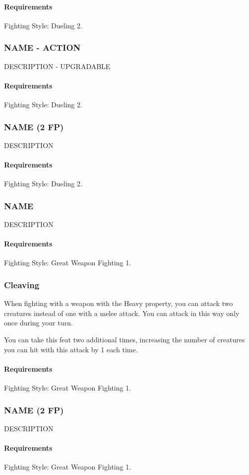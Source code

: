     \paragraph{Requirements} Fighting Style: Dueling 2.
\subsubsection{NAME - ACTION} \label{feat::name}
    DESCRIPTION - UPGRADABLE
    \paragraph{Requirements} Fighting Style: Dueling 2.
\subsubsection{NAME (2 FP)} \label{feat::name}
    DESCRIPTION
    \paragraph{Requirements} Fighting Style: Dueling 2.
\subsubsection{NAME} \label{feat::name}
    DESCRIPTION
    \paragraph{Requirements} Fighting Style: Great Weapon Fighting 1.
\subsubsection{Cleaving} \label{feat::cleaving}
    When fighting with a weapon with the Heavy property, you can attack two creatures instead of one with a melee attack.
    You can attack in this way only once during your turn.

    You can take this feat two additional times, increasing the number of creatures you can hit with this attack by 1 each time.
    \paragraph{Requirements} Fighting Style: Great Weapon Fighting 1.
\subsubsection{NAME (2 FP)} \label{feat::name}
    DESCRIPTION
    \paragraph{Requirements} Fighting Style: Great Weapon Fighting 1.

